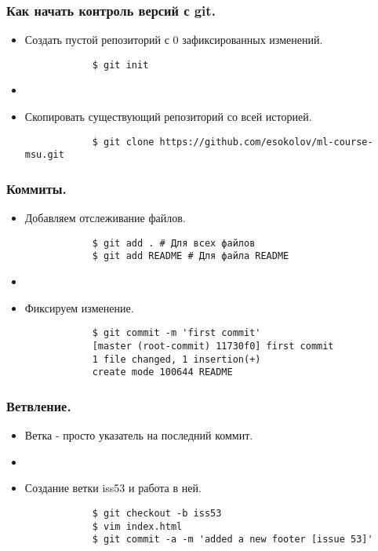 \documentclass[]{beamer}
\begin{document}
\begin{frame}[fragile] \frametitle{Как начать контроль версий с git.}
	\begin{itemize}
		\item Создать пустой репозиторий с 0 зафиксированных изменений.
		\begin{verbatim}
			$ git init
		\end{verbatim}
		\item[~]

		\item Скопировать существующий репозиторий со всей историей.
		\begin{verbatim}
			$ git clone https://github.com/esokolov/ml-course-msu.git
		\end{verbatim}
	\end{itemize}
\end{frame}

\begin{frame}[fragile] \frametitle{Коммиты.}
	\begin{itemize}
		\item Добавляем отслеживание файлов.
		\begin{verbatim}
			$ git add . # Для всех файлов
			$ git add README # Для файла README
		\end{verbatim}
		\item[~]
		\item Фиксируем изменение.
		\begin{verbatim}
			$ git commit -m 'first commit'
			[master (root-commit) 11730f0] first commit
			1 file changed, 1 insertion(+)
			create mode 100644 README
		\end{verbatim}
	\end{itemize}
\end{frame}

\begin{frame}[fragile] \frametitle{Ветвление.}
	\begin{itemize}
		\item Ветка - просто указатель на последний коммит.
		\item[~]

		\item Создание ветки iss53 и работа в ней.
		\begin{verbatim}
			$ git checkout -b iss53
			$ vim index.html
			$ git commit -a -m 'added a new footer [issue 53]'
		\end{verbatim}
	\end{itemize}
\end{frame}
\end{document}
